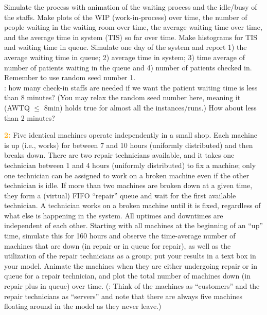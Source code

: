 \documentclass{article}
\begin{document}
Simulate the process with animation of the waiting process and the idle/busy of the staffs. Make plots of the WIP (work-in-process) over time, the number of people waiting in the waiting room over time, the average waiting time over time, and the average time in system (TIS) so far over time. Make histograms for TIS and waiting time in queue. Simulate one day of the system and report 1) the average waiting time in queue; 2) average time in system; 3) time average of number of patients waiting in the queue and  4) number of patients checked in. Remember to use random seed number 1. \\

\textit{\color{cyan}{Open question}}: how many check-in staffs are needed if we want the patient waiting time is less than 8 minutes? (You may relax the random seed number here, meaning it (AWTQ $\leq$ 8min) holds true for almost all the instances/runs.) How about less than 2 minutes?

\vskip 0.3in

\textcolor{orange}{\bf 2:} Five identical machines operate independently in a small shop. Each machine is up (i.e., works) for between 7 and 10 hours (uniformly distributed) and then breaks down. There are two repair technicians available, and it takes one technician between 1 and 4 hours (uniformly distributed) to fix a machine; only one technician can be assigned to work on a broken machine even if the other technician is idle. If more than two machines are broken down at a given time, they form a (virtual) FIFO ``repair'' queue and wait for the first available technician. A technician works on a broken machine until it is fixed, regardless of what else is happening in the system. All uptimes and downtimes are independent of each other. Starting with all machines at the beginning of an ``up'' time, simulate this for 160 hours and observe the time-average number of machines that are down (in repair or in queue for repair), as well as the utilization of the repair technicians as a group; put your results in a text box in your model. Animate the machines when they are either undergoing repair or in queue for a repair technician, and plot the total number of machines down (in repair plus in queue) over time. ({\color{cyan}{HINT}}: Think of the machines as ``customers'' and the repair technicians as ``servers'' and note that there are always five machines floating around in the model as they never leave.)        
\vskip 0.3in
\end{document}
